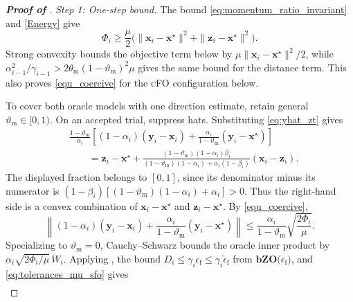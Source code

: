 \documentclass{article}
\begin{document}
\begin{proof}[\textbf{Proof of }]
\label{proof:mu_pos_sfo_bzo}
\noindent\emph{Step 1: One-step bound.}
The bound \eqref{eq:momentum_ratio_invariant} and \eqref{Energy} give
\begin{equation}\label{equ_coercive}
\Phi_i\ge\frac{\mu}{2}
\bigl(\|\bm{x}_i-\bm{x}^\star\|^2+\|\bm{z}_i-\bm{x}^\star\|^2\bigr).
\end{equation}
Strong convexity bounds the objective term below by
\(\mu\|\bm{x}_i-\bm{x}^\star\|^2/2\), while
\(\alpha_{i-1}^2/\gamma_{i-1}>
2\theta_{\mathrm{m}}(1-\vartheta_{\mathrm{m}})^2\mu\) gives the same bound
for the distance term. This also proves \eqref{equ_coercive} for
the \textsc{cFO} configuration below.

To cover both oracle models with one direction estimate, retain general
\(\vartheta_{\mathrm{m}}\in[0,1)\). On an accepted trial, suppress hats. Substituting
\eqref{eq:yhat_zt} gives
\[
\begin{aligned}
&\frac{1-\vartheta_{\mathrm{m}}}{\alpha_i}
\left[(1-\alpha_i)(\bm{y}_i-\bm{x}_i)
+\frac{\alpha_i}{1-\vartheta_{\mathrm{m}}}(\bm{y}_i-\bm{x}^\star)\right]\\
&\qquad=\bm{z}_i-\bm{x}^\star+
\frac{(1-\vartheta_{\mathrm{m}})(1-\alpha_i)\beta_i}
{(1-\vartheta_{\mathrm{m}})(1-\alpha_i)+\alpha_i(1-\beta_i)}
(\bm{x}_i-\bm{z}_i).
\end{aligned}
\]
The displayed fraction belongs to \([0,1]\), since its denominator
minus its numerator is
\((1-\beta_i)[(1-\vartheta_{\mathrm{m}})(1-\alpha_i)+\alpha_i]>0\).
Thus the right-hand side is a convex combination of
\(\bm{x}_i-\bm{x}^\star\) and \(\bm{z}_i-\bm{x}^\star\). By \eqref{equ_coercive},
\begin{equation}\label{eq:sc_error_direction_bound}
\left\|(1-\alpha_i)(\bm{y}_i-\bm{x}_i)
+\frac{\alpha_i}{1-\vartheta_{\mathrm{m}}}(\bm{y}_i-\bm{x}^\star)\right\|
\le\frac{\alpha_i}{1-\vartheta_{\mathrm{m}}}\sqrt{\frac{2\Phi_i}{\mu}}.
\end{equation}
Specializing to \(\vartheta_{\mathrm{m}}=0\), Cauchy--Schwarz bounds the
oracle inner product by \(\alpha_i\sqrt{2\Phi_i/\mu}\,W_i\).
Applying , the bound \(D_i\le\gamma_i\epsilon_{\mathrm f}\le\gamma_i\widetilde\epsilon_{\mathrm f}\) from \(\textbf{bZO(}\epsilon_{\mathrm f}\textbf{)}\), and \eqref{eq:tolerances_mu_sfo} gives
\begin{equation}\label{eq:regulated_one_step_mu_sfo}
\begin{aligned}

\end{aligned}
\end{equation}
\end{proof}
\end{document}

